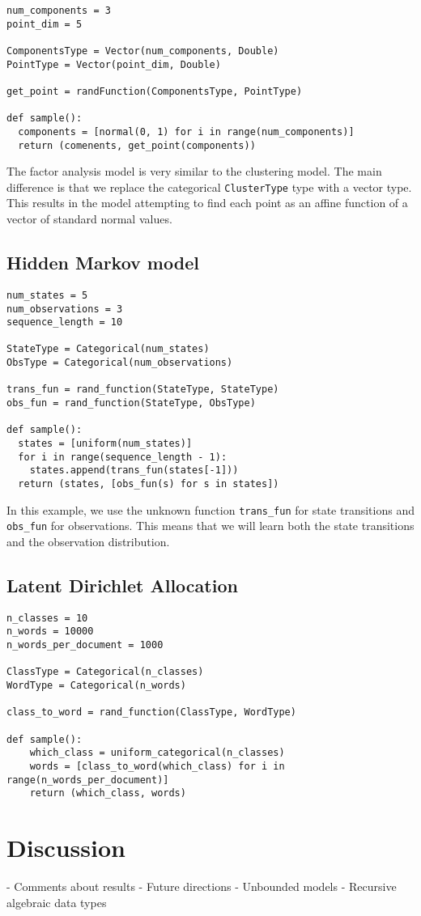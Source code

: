 \documentclass[proceed]{article}
\begin{document}
\begin{verbatim}
num_components = 3
point_dim = 5

ComponentsType = Vector(num_components, Double)
PointType = Vector(point_dim, Double)

get_point = randFunction(ComponentsType, PointType)

def sample():
  components = [normal(0, 1) for i in range(num_components)]
  return (comenents, get_point(components))
\end{verbatim}

The factor analysis model is very similar to the clustering model.  The main difference is that we replace the categorical \texttt{ClusterType} type with a vector type.  This results in the model attempting to find each point as an affine function of a vector of standard normal values.

  \subsection{Hidden Markov model}
\begin{verbatim}
num_states = 5
num_observations = 3
sequence_length = 10

StateType = Categorical(num_states)
ObsType = Categorical(num_observations)

trans_fun = rand_function(StateType, StateType)
obs_fun = rand_function(StateType, ObsType)

def sample():
  states = [uniform(num_states)]
  for i in range(sequence_length - 1):
    states.append(trans_fun(states[-1]))
  return (states, [obs_fun(s) for s in states])
\end{verbatim}

In this example, we use the unknown function \texttt{trans\_fun} for state transitions and \texttt{obs\_fun} for observations.  This means that we will learn both the state transitions and the observation distribution.

\subsection{Latent Dirichlet Allocation}

\begin{verbatim}
n_classes = 10
n_words = 10000
n_words_per_document = 1000

ClassType = Categorical(n_classes)
WordType = Categorical(n_words)

class_to_word = rand_function(ClassType, WordType)

def sample():
    which_class = uniform_categorical(n_classes)
    words = [class_to_word(which_class) for i in range(n_words_per_document)]
    return (which_class, words)
\end{verbatim}

  \section{Discussion}

  - Comments about results
  - Future directions
    - Unbounded models
    - Recursive algebraic data types
\end{document}
